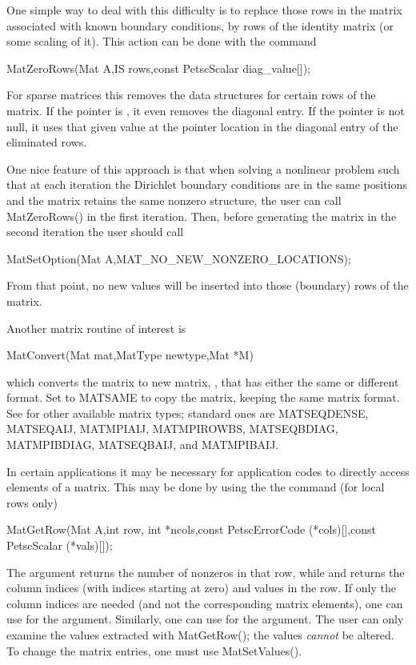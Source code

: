 One simple way to deal with this difficulty is to replace those rows in the 
matrix associated with known boundary conditions, by rows of the 
identity matrix (or some scaling of it). This action can be done with 
the command 
\begin{tabbing}
  MatZeroRows(Mat A,IS rows,const PetscScalar diag\_value[]);
\end{tabbing}
For sparse matrices this removes the data structures for certain rows 
of the matrix. If the pointer  is , it 
even removes the diagonal entry. If the pointer is not null, it uses that 
given value at the pointer location 
in the diagonal entry of the eliminated rows. 

One nice feature of this approach is that when solving a nonlinear problem 
such that at each iteration the Dirichlet boundary conditions are in the 
same positions and the matrix retains the same nonzero structure, the user 
can call MatZeroRows() in the first iteration. Then, before generating 
the matrix in the second iteration the user should call
\begin{tabbing}
  MatSetOption(Mat A,MAT\_NO\_NEW\_NONZERO\_LOCATIONS);
\end{tabbing}
From that point, 
no new values will be inserted into those (boundary) rows of 
the matrix.  

Another matrix routine of interest is 
\begin{tabbing}
  MatConvert(Mat mat,MatType newtype,Mat *M)
\end{tabbing}
which converts the matrix  to new matrix, , that has
either the same or different format.  Set  to MATSAME
to copy the matrix, keeping the same matrix format.  See 
 for other available matrix types;
standard ones are MATSEQDENSE, MATSEQAIJ, MATMPIAIJ, 
               MATMPIROWBS, MATSEQBDIAG, MATMPIBDIAG,  MATSEQBAIJ, and
               MATMPIBAIJ.

In certain applications it may be necessary for application codes
to directly access elements of a matrix. This may be done by using the 
the command (for local rows only)
\begin{tabbing}
  MatGetRow(Mat A,int row, int *ncols,const PetscErrorCode (*cols)[],const PetscScalar (*vals)[]);
\end{tabbing}
The argument  returns the number of nonzeros in that row, 
while  and  returns the column indices (with indices
starting at zero) and values in the row. If only the column 
indices are needed (and not the corresponding matrix elements), one
can use  for the  argument. Similarly,
one can use  for the  argument.
The user can only examine the values extracted with MatGetRow();
the values {\em cannot} be altered. 
 
To change the matrix entries, one must use MatSetValues().

